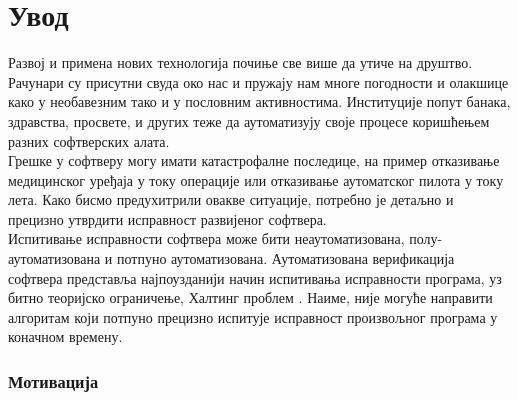 \documentclass[12pt,oneside]{memoir}
\begin{document}
\frontmatter
\naslovna
\komisija
\apstrakt
\mainmatter
\tableofcontents





\chapter{Увод} 
 Развој и примена нових технологија почиње све више да утиче на друштво. Рачунари су присутни свуда око нас и пружају нам многе погодности и олакшице како у необавезним тако и у пословним активностима. Институције попут банака, здравства, просвете, и других теже да аутоматизују своје процесе коришћењем разних софтверских алата.  \\
\indent Грешке у софтверу могу имати катастрофалне последице, на пример отказивање медицинског уређаја у току операције или отказивање аутоматског пилота у току лета. Како бисмо предухитрили овакве ситуације, потребно је детаљно и прецизно утврдити исправност развијеног софтвера. \\
\indent Испитивање исправности софтвера може бити неаутоматизована, полу-аутоматизована и потпуно аутоматизована. Аутоматизована верификација софтвера представља најпоузданији начин испитивања исправности програма, уз битно теоријско ограничење, Халтинг проблем \cite{halting}. Наиме, није могуће направити алгоритам који потпуно прецизно испитује исправност произвољног програма у коначном времену. \\
\subsection{Мотивација}
\end{document}

